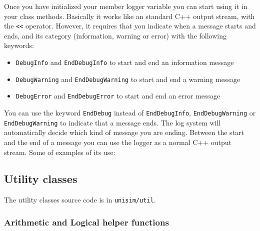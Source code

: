 Once you have initialized your member logger variable you can start using it in your class methods.
Basically it works like an standard C++ output stream, with the \texttt{<<} operator. 
However, it requires that you indicate when a message starts and ends, and its category (information, warning or error) with the following keywords:
\begin{itemize}
\item \texttt{DebugInfo} and \texttt{EndDebugInfo} to start and end an information message
\item \texttt{DebugWarning} and \texttt{EndDebugWarning} to start and end a warning message
\item \texttt{DebugError} and \texttt{EndDebugError} to start and end an error message
\end{itemize}

You can use the keyword \texttt{EndDebug} instead of \texttt{EndDebugInfo}, \texttt{EndDebugWarning} or \texttt{EndDebugWarning} to indicate that a message ends.
The log system will automatically decide which kind of message you are ending. 
Between the start and the end of a message you can use the logger as a normal C++ output stream.
Some of examples of its use:
\begin{center}
	
\end{center}

\newpage
\subsection{Utility classes}
\label{tms320c3x_utils}

The utility classes source code is in \texttt{unisim/util}.

\subsubsection{Arithmetic and Logical helper functions}

